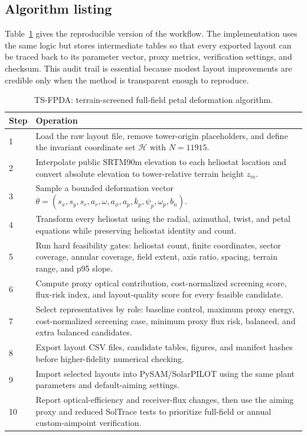 \documentclass[final,3p,times]{elsarticle}
\begin{document}
\subsection{Algorithm listing}
Table~\ref{alg:tfpda} gives the reproducible version of the workflow. The implementation uses the same logic but stores intermediate tables so that every exported layout can be traced back to its parameter vector, proxy metrics, verification settings, and checksum. This audit trail is essential because modest layout improvements are credible only when the method is transparent enough to reproduce.

\begin{longtable}{p{}p{}}
\caption{TS-FPDA: terrain-screened full-field petal deformation algorithm.}
\label{alg:tfpda}\\
\toprule
Step & Operation \\
\midrule
1 & Load the raw layout file, remove tower-origin placeholders, and define the invariant coordinate set $\mathcal{H}$ with $N=11915$. \\
2 & Interpolate public SRTM90m elevation to each heliostat location and convert absolute elevation to tower-relative terrain height $z_m$. \\
3 & Sample a bounded deformation vector $\theta=(s_x,s_y,s_r,a_r,\omega,a_\phi,a_p,k_p,\psi_p,\omega_p,b_n)$. \\
4 & Transform every heliostat using the radial, azimuthal, twist, and petal equations while preserving heliostat identity and count. \\
5 & Run hard feasibility gates: heliostat count, finite coordinates, sector coverage, annular coverage, field extent, axis ratio, spacing, terrain range, and p95 slope. \\
6 & Compute proxy optical contribution, cost-normalized screening score, flux-risk index, and layout-quality score for every feasible candidate. \\
7 & Select representatives by role: baseline control, maximum proxy energy, cost-normalized screening case, minimum proxy flux risk, balanced, and extra balanced candidates. \\
8 & Export layout CSV files, candidate tables, figures, and manifest hashes before higher-fidelity numerical checking. \\
9 & Import selected layouts into PySAM/SolarPILOT using the same plant parameters and default-aiming settings. \\
10 & Report optical-efficiency and receiver-flux changes, then use the aiming proxy and reduced SolTrace tests to prioritize full-field or annual custom-aimpoint verification. \\
\bottomrule
\end{longtable}
\end{document}
